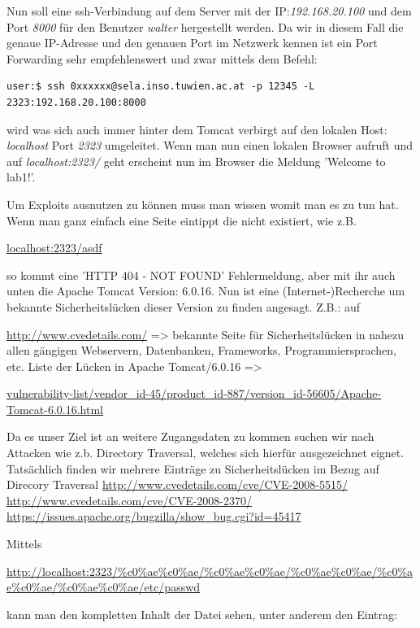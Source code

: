 \documentclass[12pt,a4paper,titlepage,oneside]{scrartcl}
\begin{document}
\noindent
Nun soll eine ssh-Verbindung auf dem Server mit der IP:\emph{192.168.20.100} und dem Port \emph{8000} für den Benutzer \emph{walter} hergestellt werden. Da wir in diesem Fall die genaue IP-Adresse und den genauen Port im Netzwerk kennen ist ein Port Forwarding sehr empfehlenswert und zwar mittels dem Befehl:


\begin{lstlisting}[caption=Port Forwarding - Tomcat Access,label=code:beispiel1,style=simple]
user:$ ssh 0xxxxxx@sela.inso.tuwien.ac.at -p 12345 -L 2323:192.168.20.100:8000
\end{lstlisting}

\noindent
wird was sich auch immer hinter dem Tomcat verbirgt auf den lokalen Host: \emph{localhost} Port \emph{2323} umgeleitet. Wenn man nun einen lokalen Browser aufruft und auf \emph{localhost:2323/} geht erscheint nun im Browser die Meldung 'Welcome to lab1!'.

\noindent
Um Exploits ausnutzen zu können muss man wissen womit man es zu tun hat. Wenn man ganz einfach eine Seite eintippt die nicht existiert, wie z.B. 

\url{localhost:2323/asdf} 

\noindent
so kommt eine 'HTTP 404 - NOT FOUND' Fehlermeldung, aber mit ihr auch unten die Apache Tomcat Version: 6.0.16. Nun ist eine (Internet-)Recherche um bekannte Sicherheitslücken dieser Version zu finden angesagt. Z.B.: auf 

\url{http://www.cvedetails.com/} => bekannte Seite für Sicherheitslücken in nahezu allen gängigen Webservern, Datenbanken, Frameworks, Programmiersprachen, etc.
Liste der Lücken in Apache Tomcat/6.0.16 => 

\url{vulnerability-list/vendor_id-45/product_id-887/version_id-56605/Apache-Tomcat-6.0.16.html}

\noindent
Da es unser Ziel ist an weitere Zugangsdaten zu kommen suchen wir nach Attacken wie z.b. Directory Traversal, welches sich hierfür ausgezeichnet eignet.
Tatsächlich finden wir mehrere Einträge zu Sicherheitslücken im Bezug auf Direcory Traversal
\url{http://www.cvedetails.com/cve/CVE-2008-5515/}
\url{http://www.cvedetails.com/cve/CVE-2008-2370/}
\url{https://issues.apache.org/bugzilla/show_bug.cgi?id=45417}

\noindent
Mittels


\url{http://localhost:2323/\%c0\%ae\%c0\%ae/\%c0\%ae\%c0\%ae/\%c0\%ae\%c0\%ae/\%c0\%ae\%c0\%ae/\%c0\%ae\%c0\%ae/etc/passwd}

\noindent
kann man den kompletten Inhalt der Datei sehen, unter anderem den Eintrag:
\end{document}
